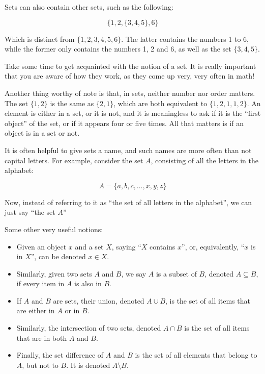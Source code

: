 \documentclass[12pt,a4paper]{article}
\theoremstyle{definition}
\theoremstyle{definition}
\theoremstyle{plain}
\theoremstyle{plain}
\begin{document}
	Sets can also contain other sets, such as the following:
	
	\[\{1, 2, \{3, 4, 5\}, 6\}\]
	
	Which is distinct from $\{1,2,3,4,5,6\}$. The latter contains the numbers 1 to 6, while the former only contains the numbers 1, 2 and 6, as well as the set $\{3,4,5\}$.
	
	Take some time to get acquainted with the notion of a set. It is really important that you are aware of how they work, as they come up very, very often in math!
	
	Another thing worthy of note is that, in sets, neither number nor order matters. The set $\{1,2\}$ is the same as $\{2,1\}$, which are both equivalent to $\{1,2,1,1,2\}$. An element is either in a set, or it is not, and it is meaningless to ask if it is the ``first object'' of the set, or if it appears four or five times. All that matters is if an object is in a set or not.
	
	It is often helpful to give sets a name, and such names are more often than not capital letters. For example, consider the set $A$, consisting of all the letters in the alphabet:
	
	\[A = \{a,b,c, \ldots ,x,y,z\}\]
	
	Now, instead of referring to it as ``the set of all letters in the alphabet'', we can just say ``the set $A$''

	\smallskip
	
	Some other very useful notions:
	
	\begin{itemize}
		\item Given an object $x$ and a set $X$, saying ``$X$ contains $x$'', or, equivalently, ``$x$ is in $X$'', can be denoted $x \in X$.
		
		\item Similarly, given two sets $A$ and $B$, we say $A$ is a subset of $B$, denoted $A \subseteq B$, if every item in $A$ is also in $B$.
		
		\item If $A$ and $B$ are sets, their union, denoted $A \cup B$, is the set of all items that are either in $A$ or in $B$.
		
		\item Similarly, the intersection of two sets, denoted $A \cap B$ is the set of all items that are in both $A$ and $B$.
		
		\item Finally, the set difference of $A$ and $B$ is the set of all elements that belong to $A$, but not to $B$. It is denoted $A \setminus B$.
	\end{itemize}
	
\end{document}
